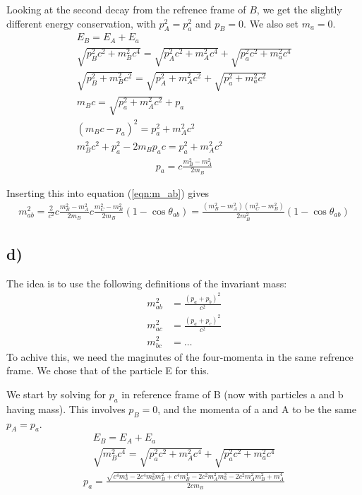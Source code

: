 \documentclass[12p,a4paper]{article}
\begin{document}
Looking at the second decay from the refrence frame of $B$, we get the slightly different energy conservation, with $p_A^2 = p_a^2$ and $p_B = 0$. We also set $m_a = 0$.
\begin{gather*}
    E_B = E_A + E_a \\
    \sqrt{p_B^2c^2 + m_B^2c^4} = \sqrt{p_A^2c^2 + m_A^2c^4} + \sqrt{p_a^2c^2 + m_a^2c^4} \\
    \sqrt{p_B^2 + m_B^2c^2} = \sqrt{p_A^2 + m_A^2c^2} + \sqrt{p_a^2 + m_a^2c^2} \\
    m_Bc = \sqrt{p_a^2 + m_A^2c^2} + p_a \\
    (m_Bc - p_a)^2 = p_a^2 + m_A^2c^2 \\
    m_B^2c^2+ p_a^2 - 2m_Bp_ac = p_a^2 + m_A^2c^2
\end{gather*}
\begin{gather}
    p_a = c\frac{m_B^2 - m_A^2}{2m_B}
\end{gather}

Inserting this into equation (\ref{eqn:m_ab}) gives
\begin{align*}
    m_{ab}^2 = \frac{2}{c^2}c\frac{m_B^2 - m_A^2}{2m_B}c\frac{m_C^2 - m_B^2}{2m_B}(1-\cos{\theta_{ab}}) = \frac{(m_B^2 - m_A^2)(m_C^2 - m_B^2)}{2m_B^2}(1-\cos{\theta_{ab}})
\end{align*}



\subsection*{d)}
The idea is to use the following definitions of the invariant mass:
\begin{align*}
    m_{ab}^2 &= \frac{(p_a + p_b)^2}{c^2}\\
    m_{ac}^2 &= \frac{(p_a + p_c)^2}{c^2}\\
    m_{bc}^2 &= \dots
\end{align*}
To achive this, we need the maginutes of the four-momenta in the same refrence frame. We chose that of the particle E for this.

We start by solving for $p_a$ in reference frame of B (now with particles a and b having mass). This involves $p_B = 0$, and the momenta of a and A to be the same $p_A = p_a$.
\begin{gather*}
    E_B = E_A + E_a \\
    \sqrt{m_B^2c^4} = \sqrt{p_a^2c^2 + m_A^2c^4} + \sqrt{p_a^2c^2 + m_a^2c^4}
\end{gather*}
\begin{align}
    p_a = \frac{\sqrt{ c^4m_a^4 - 2c^4m_a^2m_B^2 + c^4m_B^4 - 2c^2m_A^2m_a^2 - 2c^2m_A^2 m_B^2 + m_A^4 }}{ 2cm_B }
\end{align}
\end{document}
